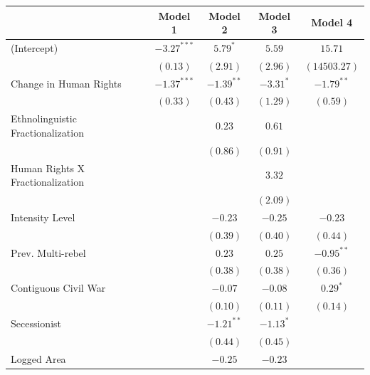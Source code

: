 \documentclass[12pt,]{book}
\let\origtable\table
\let\endorigtable\endtable
\renewenvironment{table}[1][2] {
    \singlespacing
    \expandafter\origtable\expandafter[H]
} {
    \endorigtable
}
\theoremstyle{definition}
\theoremstyle{definition}
\theoremstyle{definition}
\theoremstyle{remark}
\begin{document}
\begin{table}
\begin{center}
\begin{tabular}{l c c c c }
\hline
 & Model 1 & Model 2 & Model 3 & Model 4 \\
\hline
(Intercept)                       & $-3.27^{***}$ & $5.79^{*}$   & $5.59$      & $15.71$      \\
                                  & $(0.13)$      & $(2.91)$     & $(2.96)$    & $(14503.27)$ \\
Change in Human Rights            & $-1.37^{***}$ & $-1.39^{**}$ & $-3.31^{*}$ & $-1.79^{**}$ \\
                                  & $(0.33)$      & $(0.43)$     & $(1.29)$    & $(0.59)$     \\
Ethnolinguistic Fractionalization &               & $0.23$       & $0.61$      &              \\
                                  &               & $(0.86)$     & $(0.91)$    &              \\
Human Rights X Fractionalization  &               &              & $3.32$      &              \\
                                  &               &              & $(2.09)$    &              \\
Intensity Level                   &               & $-0.23$      & $-0.25$     & $-0.23$      \\
                                  &               & $(0.39)$     & $(0.40)$    & $(0.44)$     \\
Prev. Multi-rebel                 &               & $0.23$       & $0.25$      & $-0.95^{**}$ \\
                                  &               & $(0.38)$     & $(0.38)$    & $(0.36)$     \\
Contiguous Civil War              &               & $-0.07$      & $-0.08$     & $0.29^{*}$   \\
                                  &               & $(0.10)$     & $(0.11)$    & $(0.14)$     \\
Secessionist                      &               & $-1.21^{**}$ & $-1.13^{*}$ &              \\
                                  &               & $(0.44)$     & $(0.45)$    &              \\
Logged Area                       &               & $-0.25$      & $-0.23$     &              \\

\end{tabular}
\end{center}
\end{table}
\end{document}

